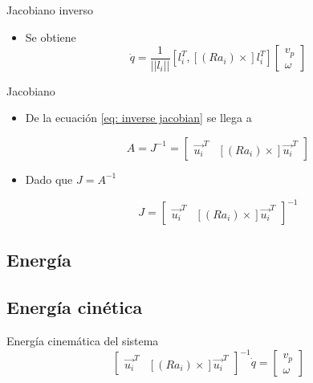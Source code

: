 \documentclass{beamer}
\begin{document}
\begin{frame}{Jacobiano inverso}

\begin{itemize}
 \item Se obtiene
\begin{equation} 
\label{eq: inverse jacobian}
\dot{q} = \frac{1}{||l_i||} [l_i^T , [(Ra_i)\times]l_i^T] \begin{bmatrix}
v_p\\
\omega
\end{bmatrix}
\end{equation}
 
\end{itemize}



\end{frame}

\begin{frame}{Jacobiano}
 \begin{itemize}
  \item De la ecuación \ref{eq: inverse jacobian} se llega a 
  
  \begin{equation}\label{jac_A}
        A = J^{-1} = 
        \begin{bmatrix}
            \vec{u_i}^T & [(Ra_i)\times]\vec{u_i}^T
        \end{bmatrix}
\end{equation}

\item Dado que $J = A ^{-1}$

\begin{equation*}
J = \begin{bmatrix}
\vec{u_i}^T & [(Ra_i)\times]\vec{u_i}^T
\end{bmatrix}^{-1}
\end{equation*}
 \end{itemize}

\end{frame}

\subsection{Energía}
\subsection{Energía cinética}

\begin{frame}{Energía cinemática del sistema}
 \begin{equation*}
\begin{bmatrix}
\vec{u_i}^T & [(Ra_i)\times]\vec{u_i}^T
\end{bmatrix}^{-1} \dot{q} = \begin{bmatrix}
v_p\\
\omega
\end{bmatrix}
\end{equation*}
\end{frame}
\end{document}
